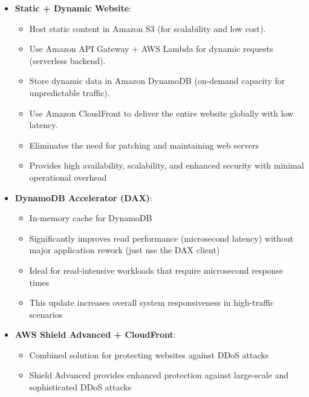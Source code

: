 \documentclass[11pt,a4paper]{report}
\begin{document}
\begin{itemize}
\begin{itemize}
  \item Store scanned documents in Amazon S3.
  \item Use S3 event notifications to trigger a Lambda function.
  \item Extract text with Amazon Textract or Amazon Rekognition (for images), then use Amazon Comprehend (or Comprehend Medical) for deeper NLP analysis.
  \item Query the results with Amazon Athena for on-demand analytics.
\end{itemize}
  \item \textbf{Static + Dynamic Website}:
\begin{itemize}
  \item Host static content in Amazon S3 (for scalability and low cost).
  \item Use Amazon API Gateway + AWS Lambda for dynamic requests (serverless backend).
  \item Store dynamic data in Amazon DynamoDB (on-demand capacity for unpredictable traffic).
  \item Use Amazon CloudFront to deliver the entire website globally with low latency.
  \item Eliminates the need for patching and maintaining web servers
  \item Provides high availability, scalability, and enhanced security with minimal operational overhead
\end{itemize}
  \item \textbf{DynamoDB Accelerator (DAX)}:
\begin{itemize}
  \item In-memory cache for DynamoDB
  \item Significantly improves read performance (microsecond latency) without major application rework (just use the DAX client)
  \item Ideal for read-intensive workloads that require microsecond response times
  \item This update increases overall system responsiveness in high-traffic scenarios
\end{itemize}
  \item \textbf{AWS Shield Advanced + CloudFront}:
\begin{itemize}
  \item Combined solution for protecting websites against DDoS attacks
  \item Shield Advanced provides enhanced protection against large-scale and sophisticated DDoS attacks

\end{itemize}
\end{itemize}
\end{document}
